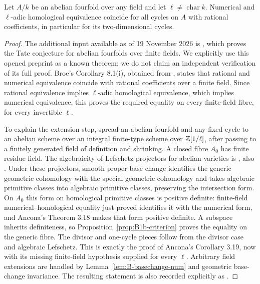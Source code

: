 \begin{theorem}\label{thm:B1b-abelian}
Let $A/k$ be an abelian fourfold over any field and let
$\ell\ne\operatorname{char}k$. Numerical and $\ell$-adic homological
equivalence coincide for all cycles on $A$ with rational coefficients,
in particular for its two-dimensional cycles.
\end{theorem}
\begin{proof}
The additional input available as of 19 November 2026 is
\cite[Theorem 1.1]{BBroe2026}, which proves the Tate conjecture for
abelian fourfolds over finite fields. We explicitly use this opened
preprint as a known theorem; we do not claim an independent verification
of its full proof. Broe's Corollary 8.1(i), obtained from
\cite[Th\'eor\`eme 1, p.~978]{BKahn2003}, states that rational and numerical
equivalence coincide with rational coefficients over a finite field.
Since rational equivalence implies $\ell$-adic homological equivalence,
which implies numerical equivalence, this proves the required equality
on every finite-field fibre, for every invertible $\ell$.

To explain the extension step, spread an abelian fourfold and any fixed
cycle to an abelian scheme over an integral finite-type scheme over
${\mathbb{Z}}[1/\ell]$, after passing to a finitely generated field of definition
and shrinking. A closed fibre $A_0$ has finite residue field. The
algebraicity of Lefschetz projectors for abelian varieties is
\cite[Theorem 2A11]{BKleiman1968}, also
\cite[Proposition 4-3(2)(c), p.~16]{BKleiman1994}.
Under these projectors, smooth proper
base change identifies the generic geometric cohomology with the special
geometric cohomology and takes algebraic primitive classes into algebraic
primitive classes, preserving the intersection form.
On $A_0$ this form on homological primitive classes is positive definite:
finite-field numerical--homological equality just proved identifies it
with the numerical form, and Ancona's Theorem 3.18 makes that form
positive definite. A subspace inherits definiteness, so
Proposition~\ref{prop:B1b-criterion} proves the equality on the generic
fibre. The divisor and one-cycle pieces follow from the divisor case and
algebraic Lefschetz. This is exactly the proof of Ancona's
Corollary 3.19, now with its missing finite-field hypothesis supplied for
every $\ell$. Arbitrary field extensions are handled by
Lemma~\ref{lem:B-basechange-num} and geometric base-change invariance.
The resulting statement is also recorded explicitly as
\cite[Corollaries 1.2 and 8.2]{BBroe2026}.
\end{proof}

